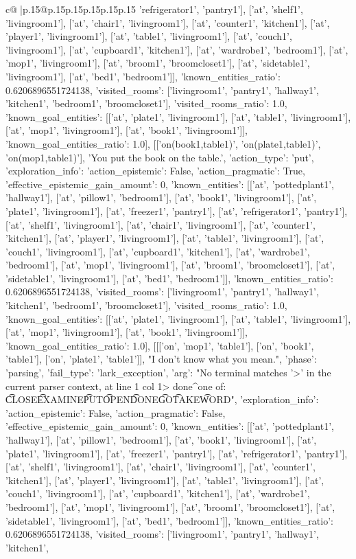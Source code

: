 \documentclass{article}
\begin{document}
{\begin{supertabular}{c@{$\;$}|p{.15\linewidth}@{}p{.15\linewidth}p{.15\linewidth}p{.15\linewidth}p{.15\linewidth}p{.15\linewidth}}
{{{'refrigerator1', 'pantry1'], ['at', 'shelf1', 'livingroom1'], ['at', 'chair1', 'livingroom1'], ['at', 'counter1', 'kitchen1'], ['at', 'player1', 'livingroom1'], ['at', 'table1', 'livingroom1'], ['at', 'couch1', 'livingroom1'], ['at', 'cupboard1', 'kitchen1'], ['at', 'wardrobe1', 'bedroom1'], ['at', 'mop1', 'livingroom1'], ['at', 'broom1', 'broomcloset1'], ['at', 'sidetable1', 'livingroom1'], ['at', 'bed1', 'bedroom1']], 'known_entities_ratio': 0.6206896551724138, 'visited_rooms': ['livingroom1', 'pantry1', 'hallway1', 'kitchen1', 'bedroom1', 'broomcloset1'], 'visited_rooms_ratio': 1.0, 'known_goal_entities': [['at', 'plate1', 'livingroom1'], ['at', 'table1', 'livingroom1'], ['at', 'mop1', 'livingroom1'], ['at', 'book1', 'livingroom1']], 'known_goal_entities_ratio': 1.0}}], [['on(book1,table1)', 'on(plate1,table1)', 'on(mop1,table1)'], 'You put the book on the table.', {'action_type': 'put', 'exploration_info': {'action_epistemic': False, 'action_pragmatic': True, 'effective_epistemic_gain_amount': 0, 'known_entities': [['at', 'pottedplant1', 'hallway1'], ['at', 'pillow1', 'bedroom1'], ['at', 'book1', 'livingroom1'], ['at', 'plate1', 'livingroom1'], ['at', 'freezer1', 'pantry1'], ['at', 'refrigerator1', 'pantry1'], ['at', 'shelf1', 'livingroom1'], ['at', 'chair1', 'livingroom1'], ['at', 'counter1', 'kitchen1'], ['at', 'player1', 'livingroom1'], ['at', 'table1', 'livingroom1'], ['at', 'couch1', 'livingroom1'], ['at', 'cupboard1', 'kitchen1'], ['at', 'wardrobe1', 'bedroom1'], ['at', 'mop1', 'livingroom1'], ['at', 'broom1', 'broomcloset1'], ['at', 'sidetable1', 'livingroom1'], ['at', 'bed1', 'bedroom1']], 'known_entities_ratio': 0.6206896551724138, 'visited_rooms': ['livingroom1', 'pantry1', 'hallway1', 'kitchen1', 'bedroom1', 'broomcloset1'], 'visited_rooms_ratio': 1.0, 'known_goal_entities': [['at', 'plate1', 'livingroom1'], ['at', 'table1', 'livingroom1'], ['at', 'mop1', 'livingroom1'], ['at', 'book1', 'livingroom1']], 'known_goal_entities_ratio': 1.0}}], [[['on', 'mop1', 'table1'], ['on', 'book1', 'table1'], ['on', 'plate1', 'table1']], "I don't know what you mean.", {'phase': 'parsing', 'fail_type': 'lark_exception', 'arg': "No terminal matches '>' in the current parser context, at line 1 col 1\n\n> done\n^\nExpected one of: \n\t* CLOSE\n\t* EXAMINE\n\t* PUT\n\t* OPEN\n\t* DONE\n\t* GO\n\t* TAKE\n\t* WORD\n", 'exploration_info': {'action_epistemic': False, 'action_pragmatic': False, 'effective_epistemic_gain_amount': 0, 'known_entities': [['at', 'pottedplant1', 'hallway1'], ['at', 'pillow1', 'bedroom1'], ['at', 'book1', 'livingroom1'], ['at', 'plate1', 'livingroom1'], ['at', 'freezer1', 'pantry1'], ['at', 'refrigerator1', 'pantry1'], ['at', 'shelf1', 'livingroom1'], ['at', 'chair1', 'livingroom1'], ['at', 'counter1', 'kitchen1'], ['at', 'player1', 'livingroom1'], ['at', 'table1', 'livingroom1'], ['at', 'couch1', 'livingroom1'], ['at', 'cupboard1', 'kitchen1'], ['at', 'wardrobe1', 'bedroom1'], ['at', 'mop1', 'livingroom1'], ['at', 'broom1', 'broomcloset1'], ['at', 'sidetable1', 'livingroom1'], ['at', 'bed1', 'bedroom1']], 'known_entities_ratio': 0.6206896551724138, 'visited_rooms': ['livingroom1', 'pantry1', 'hallway1', 'kitchen1', }}}
\end{supertabular}}
\end{document}
